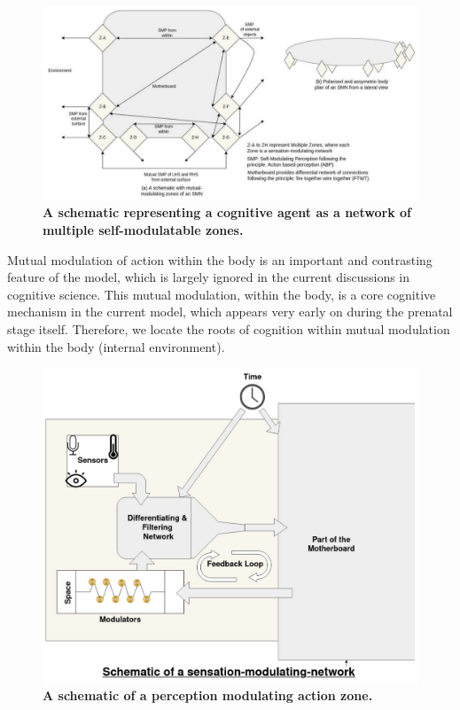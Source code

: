 \begin{figure}[ht] 
\includegraphics[width=\textwidth]{graphics/self-modulating-perception.pdf}
\caption{\textbf{A schematic representing a cognitive agent as a network of multiple self-modulatable zones.}}
\label{smn}
\end{figure}

Mutual modulation of action within the body is an important and contrasting feature of the model, which is largely ignored in the current discussions in cognitive science. This mutual modulation, within the body, is a core cognitive mechanism in the current model, which appears very early on during the prenatal stage itself. Therefore, we locate the roots of cognition within mutual modulation within the body (internal environment). 

\begin{figure}[ht] 
\includegraphics[width=\textwidth]{graphics/structure-of-Zone.pdf}
\caption{\textbf{A schematic of a perception modulating action zone.}}
\label{zone}
\end{figure}

